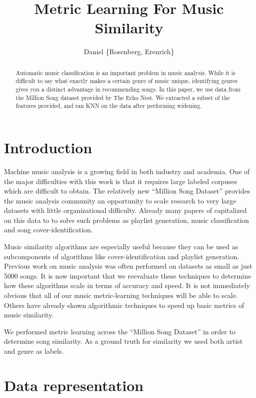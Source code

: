 \documentclass[a4paper,10pt]{article}
\title{Metric Learning For Music Similarity}
\author{Daniel \{Rosenberg, Erenrich\} }
\begin{document}
\maketitle

\begin{abstract}
Automatic music classification is an important problem in music analysis. While it is difficult to say what exactly makes a certain genre of music unique, identifying genres gives you a distinct advantage in recommending songs. In this paper, we use data from the Million Song dataset provided by The Echo Nest. We extracted a subset of the features provided, and ran KNN on the data after performing widening.
\end{abstract}

\section{Introduction}
Machine music analysis is a growing field in both industry and academia. One of the major difficulties with this work is that it requires large labeled corpuses which are difficult to obtain. The relatively new ``Million Song Dataset'' provides the music analysis community an opportunity to scale research to very large datasets with little organizational difficulty\cite{Bertin-Mahieux2011}. Already many papers of capitalized on this data to to solve such problems as playlist generation\cite{mcfee2011_nlp}, music classification and song cover-identification\cite{Bertin-Mahieux2011b}. 

Music similarity algorithms are especially useful because they can be used as subcomponents of algorithms like cover-identification and playlist generation. Previous work on music analysis was often performed on datasets as small as just 5000 songs\cite{Slaney_learninga}. It is now important that we reevaluate these techniques to determine how these algorithms scale in terms of accuracy and speed. It is not immediately obvious that all of our music metric-learning techniques will be able to scale. Others have already shown algorithmic techniques to speed up basic metrics of music similarity\cite{mcfee2011_sim}.

We performed metric learning across the ``Million Song Dataset'' in order to determine song similarity. As a ground truth for similarity we used both artist and genre as labels.
\section{Data representation}
\end{document}
